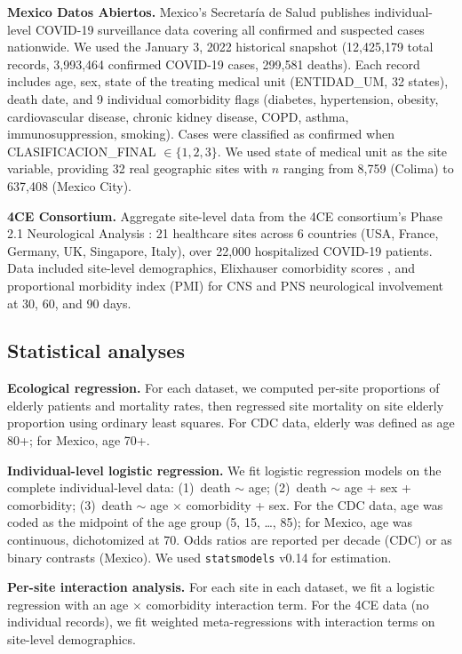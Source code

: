 \documentclass[11pt]{article}
\begin{document}
\textbf{Mexico Datos Abiertos.}  Mexico's Secretar\'{i}a de Salud publishes
individual-level COVID-19 surveillance data covering all confirmed and
suspected cases nationwide.  We used the January 3, 2022 historical snapshot
(12,425,179 total records, 3,993,464 confirmed COVID-19 cases, 299,581
deaths).  Each record includes age, sex, state of the treating medical unit
(ENTIDAD\_UM, 32 states), death date, and 9 individual comorbidity flags
(diabetes, hypertension, obesity, cardiovascular disease, chronic kidney
disease, COPD, asthma, immunosuppression, smoking).  Cases were classified as
confirmed when CLASIFICACION\_FINAL $\in \{1, 2, 3\}$.  We used state of
medical unit as the site variable, providing 32 real geographic sites with
$n$ ranging from 8,759 (Colima) to 637,408 (Mexico City).

\textbf{4CE Consortium.}  Aggregate site-level data from the 4CE consortium's
Phase 2.1 Neurological Analysis \cite{four_ce_neuro2021}: 21 healthcare sites
across 6 countries (USA, France, Germany, UK, Singapore, Italy), over 22,000
hospitalized COVID-19 patients.  Data included site-level demographics,
Elixhauser comorbidity scores \cite{elixhauser1998}, and proportional morbidity
index (PMI) for CNS and PNS neurological involvement at 30, 60, and 90 days.

\subsection{Statistical analyses}

\textbf{Ecological regression.}  For each dataset, we computed per-site
proportions of elderly patients and mortality rates, then regressed site
mortality on site elderly proportion using ordinary least squares.  For CDC
data, elderly was defined as age 80+; for Mexico, age 70+.

\textbf{Individual-level logistic regression.}  We fit logistic regression
models on the complete individual-level data: (1)~death $\sim$ age;
(2)~death $\sim$ age + sex + comorbidity; (3)~death $\sim$ age $\times$
comorbidity + sex.  For the CDC data, age was coded as the midpoint of the
age group (5, 15, \ldots, 85); for Mexico, age was continuous, dichotomized
at 70.  Odds ratios are reported per decade (CDC) or as binary contrasts
(Mexico).  We used \texttt{statsmodels} v0.14 for estimation.

\textbf{Per-site interaction analysis.}  For each site in each dataset, we
fit a logistic regression with an age $\times$ comorbidity interaction term.
For the 4CE data (no individual records), we fit weighted meta-regressions
with interaction terms on site-level demographics.
\end{document}
